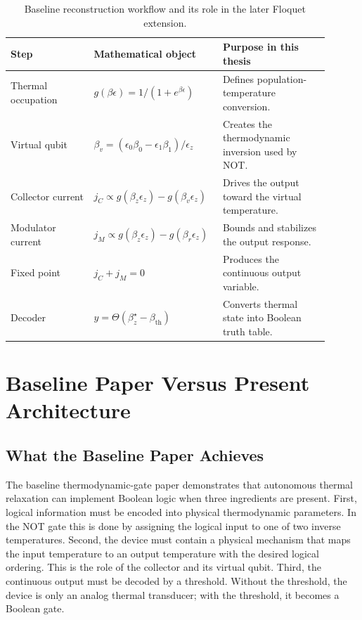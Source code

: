\documentclass[11pt]{article}
\begin{document}
\begin{table}[H]
\centering
\caption{Baseline reconstruction workflow and its role in the later Floquet extension.}
\begin{tabular}{p{0.25\linewidth}p{0.33\linewidth}p{0.32\linewidth}}
\toprule
Step & Mathematical object & Purpose in this thesis \\
\midrule
Thermal occupation & $g(\beta\epsilon)=1/(1+e^{\beta\epsilon})$ &
Defines population-temperature conversion. \\
Virtual qubit & $\beta_v=(\epsilon_0\beta_0-\epsilon_1\beta_1)/\epsilon_z$ &
Creates the thermodynamic inversion used by NOT. \\
Collector current & $j_C\propto g(\beta_z\epsilon_z)-g(\beta_v\epsilon_z)$ &
Drives the output toward the virtual temperature. \\
Modulator current & $j_M\propto g(\beta_z\epsilon_z)-g(\beta_r\epsilon_z)$ &
Bounds and stabilizes the output response. \\
Fixed point & $j_C+j_M=0$ &
Produces the continuous output variable. \\
Decoder & $y=\Theta(\beta_z^\star-\beta_{\mathrm{th}})$ &
Converts thermal state into Boolean truth table. \\
\bottomrule
\end{tabular}
\end{table}

\clearpage
\section{Baseline Paper Versus Present Architecture}

\subsection{What the Baseline Paper Achieves}

The baseline thermodynamic-gate paper demonstrates that autonomous thermal relaxation can
implement Boolean logic when three ingredients are present.  First, logical information must
be encoded into physical thermodynamic parameters.  In the NOT gate this is done by
assigning the logical input to one of two inverse temperatures.  Second, the device must
contain a physical mechanism that maps the input temperature to an output temperature with
the desired logical ordering.  This is the role of the collector and its virtual qubit.  Third,
the continuous output must be decoded by a threshold.  Without the threshold, the device is
only an analog thermal transducer; with the threshold, it becomes a Boolean gate.
\end{document}
